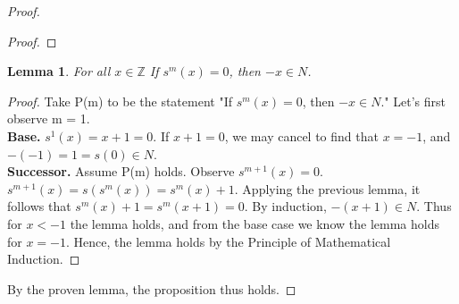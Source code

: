 \documentclass[12pt]{amsart}
\newcommand{\Z}{\mathbb{Z}}
\begin{document}
\begin{proof}
\begin{proof}
	\end{proof}
	\newtheorem*{lemma2}{Lemma}
	\begin{lemma2}
		For all $x \in \Z$ If $s^m(x) = 0$, then $-x \in N$.
	\end{lemma2}
	\begin{proof}
		Take P(m) to be the statement "If $s^m(x) = 0$, then $-x \in N$." Let's first observe m = 1.
		\\\textbf{Base.} $s^1(x) = x + 1 = 0$. If $x + 1 = 0$, we may cancel to find that $x = -1$, and $-(-1) = 1 = s(0) \in N$.
		\\\textbf{Successor.}  Assume P(m) holds. Observe $s^{m+1}(x) = 0$. $s^{m+1}(x) = s(s^m(x)) = s^m(x) + 1$. Applying the previous lemma, it follows that $ s^m(x) + 1 = s^m(x+1) = 0$. By induction, $-(x+1) \in N$. Thus for $x < -1$ the lemma holds, and from the base case we know the lemma holds for $x = -1$. Hence, the lemma holds by the Principle of Mathematical Induction.
	\end{proof}
	\noindent By the proven lemma, the proposition thus holds.

\end{proof}
\end{document}
